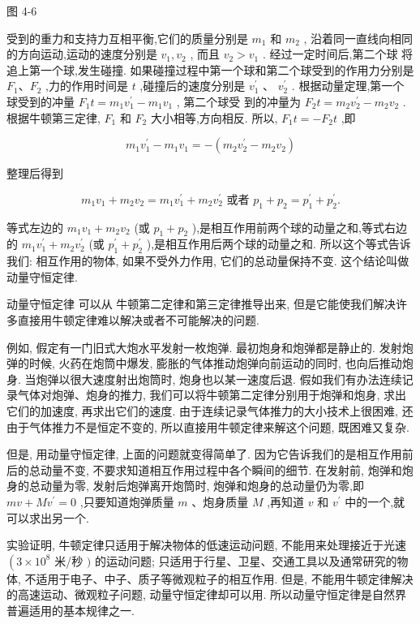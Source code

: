 \documentclass[10pt]{article}
\begin{document}
图 4-6

受到的重力和支持力互相平衡,它们的质量分别是 \({m}_{1}\) 和 \({m}_{2}\) , 沿着同一直线向相同的方向运动,运动的速度分别是 \({v}_{1},{v}_{2}\) , 而且 \({v}_{2} > {v}_{1}\) . 经过一定时间后,第二个球 将追上第一个球,发生碰撞. 如果碰撞过程中第一个球和第二个球受到的作用力分别是 \({F}_{1}\text{、}{F}_{2}\) ,力的作用时间是 \(t\) ,碰撞后的速度分别是 \({v}_{1}^{\prime }\) 、 \({v}_{2}^{\prime }\) . 根据动量定理,第一个球受到的冲量 \({F}_{1}t = {m}_{1}{v}_{1}^{\prime } - {m}_{1}{v}_{1}\) , 第二个球受 到的冲量为 \({F}_{2}t = {m}_{2}{v}_{2}^{\prime } - {m}_{2}{v}_{2}\) . 根据牛顿第三定律, \({F}_{1}\) 和 \({F}_{2}\) 大小相等,方向相反. 所以, \({F}_{1}t = - {F}_{2}t\) ,即

\[
{m}_{1}{v}_{1}^{\prime } - {m}_{1}{v}_{1} = - \left( {{m}_{2}{v}_{2}^{\prime } - {m}_{2}{v}_{2}}\right)
\]

整理后得到

\[
{m}_{1}{v}_{1} + {m}_{2}{v}_{2} = {m}_{1}{v}_{1}^{\prime } + {m}_{2}{v}_{2}^{\prime }\text{ 或者 }{p}_{1} + {p}_{2} = {p}_{1}^{\prime } + {p}_{2}^{\prime }.
\]

等式左边的 \({m}_{1}{v}_{1} + {m}_{2}{v}_{2}\) (或 \({p}_{1} + {p}_{2}\) ),是相互作用前两个球的动量之和,等式右边的 \({m}_{1}{v}_{1}^{\prime } + {m}_{2}{v}_{2}^{\prime }\) (或 \({p}_{1}^{\prime } + {p}_{2}^{\prime }\) ),是相互作用后两个球的动量之和. 所以这个等式告诉我们: 相互作用的物体, 如果不受外力作用, 它们的总动量保持不变. 这个结论叫做动量守恒定律.

动量守恒定律 可以从 牛顿第二定律和第三定律推导出来, 但是它能使我们解决许多直接用牛顿定律难以解决或者不可能解决的问题.

例如, 假定有一门旧式大炮水平发射一枚炮弹. 最初炮身和炮弹都是静止的. 发射炮弹的时候, 火药在炮筒中爆发, 膨胀的气体推动炮弹向前运动的同时, 也向后推动炮身. 当炮弹以很大速度射出炮筒时, 炮身也以某一速度后退. 假如我们有办法连续记录气体对炮弹、炮身的推力, 我们可以将牛顿第二定律分别用于炮弹和炮身, 求出它们的加速度, 再求出它们的速度. 由于连续记录气体推力的大小技术上很困难, 还由于气体推力不是恒定不变的, 所以直接用牛顿定律来解这个问题, 既困难又复杂.

但是, 用动量守恒定律, 上面的问题就变得简单了. 因为它告诉我们的是相互作用前后的总动量不变, 不要求知道相互作用过程中各个瞬间的细节. 在发射前, 炮弹和炮身的总动量为零, 发射后炮弹离开炮筒时, 炮弹和炮身的总动量仍为零,即 \({mv} + M{v}^{\prime } = 0\) ,只要知道炮弹质量 \(m\) 、炮身质量 \(M\) ,再知道 \(v\) 和 \({v}^{\prime }\) 中的一个,就可以求出另一个.

实验证明, 牛顿定律只适用于解决物体的低速运动问题, 不能用来处理接近于光速 \(\left( {3 \times {10}^{8}}\right.\) 米/秒 \()\) 的运动问题; 只适用于行星、卫星、交通工具以及通常研究的物体, 不适用于电子、中子、质子等微观粒子的相互作用. 但是, 不能用牛顿定律解决的高速运动、微观粒子问题, 动量守恒定律却可以用. 所以动量守恒定律是自然界普遍适用的基本规律之一.
\end{document}
